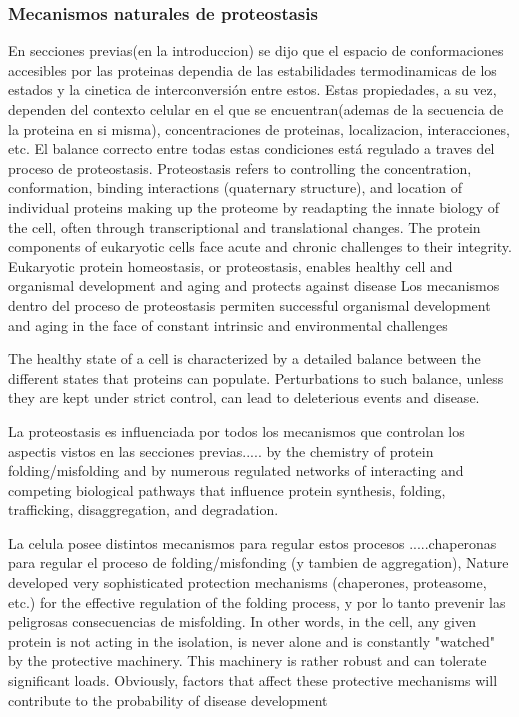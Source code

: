 \subsubsection{Mecanismos naturales de proteostasis}
En secciones previas(en la introduccion) se dijo que el espacio de conformaciones accesibles por las proteinas dependia de las estabilidades termodinamicas de los estados y la cinetica de interconversión entre estos. 
Estas propiedades, a su vez, dependen del contexto celular en el que se encuentran(ademas de la secuencia de la proteina en si misma), concentraciones de proteinas, localizacion, interacciones, etc.
El balance correcto entre todas estas condiciones está regulado a traves del proceso de proteostasis.
Proteostasis refers to controlling the concentration, conformation, binding interactions (quaternary structure), and location of individual proteins making up the proteome by readapting the innate biology of the cell, 
often through transcriptional and translational changes.
The protein components of eukaryotic cells face acute and chronic challenges to their integrity. Eukaryotic protein homeostasis, or proteostasis, enables healthy cell and organismal development and aging and protects against disease
Los mecanismos dentro del proceso de proteostasis permiten successful organismal development and aging in the face of constant intrinsic and environmental challenges %

The healthy state of a cell is characterized by a detailed balance between the different states that proteins can populate. 
Perturbations to such balance, unless they are kept under strict control, can lead to deleterious events and disease.


La proteostasis es influenciada por todos los mecanismos que controlan los aspectis vistos en las secciones previas..... by the chemistry of protein folding/misfolding and by numerous regulated networks of interacting and competing biological pathways 
that influence protein synthesis, folding, trafficking, disaggregation, and degradation.

La celula posee distintos mecanismos para regular estos procesos .....chaperonas para regular el proceso de folding/misfonding (y tambien de aggregation), 
Nature developed very sophisticated protection mechanisms (chaperones, proteasome, etc.) for the effective regulation of the folding process, y por lo tanto prevenir las peligrosas consecuencias de misfolding. 
In other words, in the cell, any given protein is not acting in the isolation, is never alone and is
constantly "watched" by the protective machinery. This machinery is rather robust and can
tolerate significant loads. Obviously, factors that affect these protective mechanisms will
contribute to the probability of disease development


